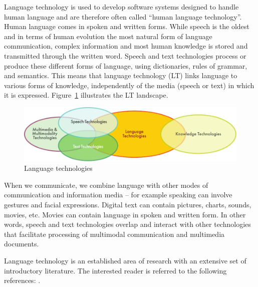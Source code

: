 

\begin{multicols}{2}
Language technology is used to develop software systems designed to handle human language and are therefore often called “human language technology”. Human language comes in spoken and written forms. While speech is the oldest and in terms of human evolution the most natural form of language communication, complex information and most human knowledge is stored and transmitted through the written word. Speech and text technologies process or produce these different forms of language, using dictionaries, rules of grammar, and semantics. This means that language technology (LT) links language to various forms of knowledge, independently of the media (speech or text) in which it is expressed. Figure~\ref{fig:ltincontext_en} illustrates the LT landscape.

\begin{figure}[htb]
  \center
  \includegraphics[width=\textwidth]{../_media/english/language_technologies}
  \caption{Language technologies}
  \label{fig:ltincontext_en}
\end{figure}

 When we communicate, we combine language with other modes of communication and information media – for example speaking can involve gestures and facial expressions. Digital text can contain pictures, charts, sounds, movies, etc. Movies can contain language in spoken and written form. In other words, speech and text technologies overlap and interact with other technologies that facilitate processing of multimodal communication and multimedia documents.

 Language technology is an established area of research with an extensive set of introductory literature. The interested reader is referred to the following references: \cite{carstensen-etal1, jurafsky-martin01, manning-schuetze1, lt-world1, lt-survey1}.


\end{multicols}
